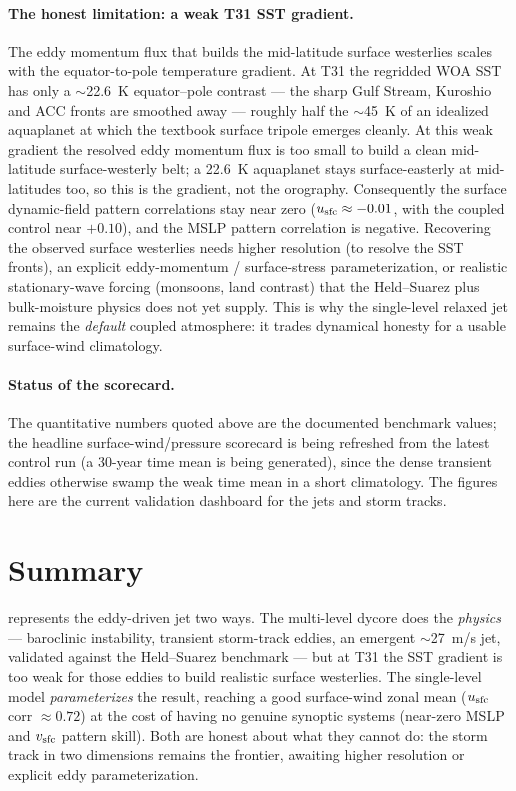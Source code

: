 \paragraph{The honest limitation: a weak T31 SST gradient.} The eddy momentum flux that builds
the mid-latitude surface westerlies scales with the equator-to-pole temperature gradient. At
T31 the regridded WOA SST has only a $\sim$22.6~K equator--pole contrast --- the sharp Gulf
Stream, Kuroshio and ACC fronts are smoothed away --- roughly half the $\sim$45~K of an
idealized aquaplanet at which the textbook surface tripole emerges cleanly. At this weak
gradient the resolved eddy momentum flux is too small to build a clean mid-latitude
surface-westerly belt; a 22.6~K aquaplanet stays surface-easterly at mid-latitudes too, so this
is the gradient, not the orography. Consequently the \dino{} surface dynamic-field pattern
correlations stay near zero ($u_{\mathrm{sfc}}\approx-0.01$, with the coupled control near
$+0.10$), and the MSLP pattern correlation is negative. Recovering the observed surface
westerlies needs higher resolution (to resolve the SST fronts), an explicit eddy-momentum /
surface-stress parameterization, or realistic stationary-wave forcing (monsoons, land contrast)
that the Held--Suarez plus bulk-moisture physics does not yet supply. This is why the
single-level relaxed jet remains the \emph{default} coupled atmosphere: it trades dynamical
honesty for a usable surface-wind climatology.

\paragraph{Status of the scorecard.} The quantitative numbers quoted above are the documented
benchmark values; the headline surface-wind/pressure scorecard is being refreshed from the
latest control run (a 30-year time mean is being generated), since the dense transient eddies
otherwise swamp the weak time mean in a short climatology. The figures here are the current
validation dashboard for the jets and storm tracks.

\section{Summary}

\model{} represents the eddy-driven jet two ways. The multi-level \dino{} dycore does the
\emph{physics} --- baroclinic instability, transient storm-track eddies, an emergent
$\sim$27~m/s jet, validated against the Held--Suarez benchmark --- but at T31 the SST gradient
is too weak for those eddies to build realistic surface westerlies. The single-level model
\emph{parameterizes} the result, reaching a good surface-wind zonal mean ($u_{\mathrm{sfc}}$
corr $\approx 0.72$) at the cost of having no genuine synoptic systems (near-zero MSLP and
$v_{\mathrm{sfc}}$ pattern skill). Both are honest about what they cannot do: the storm track
in two dimensions remains the frontier, awaiting higher resolution or explicit eddy
parameterization.

